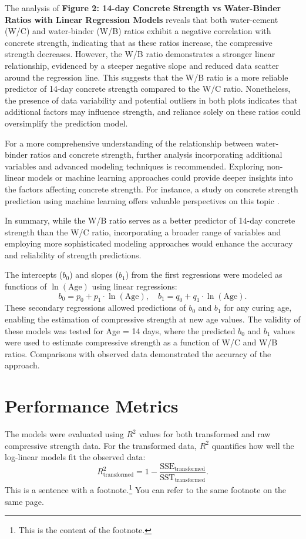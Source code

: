 \documentclass[a4paper,11pt]{article}
\begin{document}
The analysis of \textbf{Figure 2: 14-day Concrete Strength vs Water-Binder Ratios with Linear Regression Models} reveals that both water-cement (W/C) and water-binder (W/B) ratios exhibit a negative correlation with concrete strength, indicating that as these ratios increase, the compressive strength decreases. However, the W/B ratio demonstrates a stronger linear relationship, evidenced by a steeper negative slope and reduced data scatter around the regression line. This suggests that the W/B ratio is a more reliable predictor of 14-day concrete strength compared to the W/C ratio. Nonetheless, the presence of data variability and potential outliers in both plots indicates that additional factors may influence strength, and reliance solely on these ratios could oversimplify the prediction model.

For a more comprehensive understanding of the relationship between water-binder ratios and concrete strength, further analysis incorporating additional variables and advanced modeling techniques is recommended. Exploring non-linear models or machine learning approaches could provide deeper insights into the factors affecting concrete strength. For instance, a study on concrete strength prediction using machine learning offers valuable perspectives on this topic \cite{concrete_ml}.


In summary, while the W/B ratio serves as a better predictor of 14-day concrete strength than the W/C ratio, incorporating a broader range of variables and employing more sophisticated modeling approaches would enhance the accuracy and reliability of strength predictions.


The intercepts (\( b_0 \)) and slopes (\( b_1 \)) from the first regressions were modeled as functions of \( \ln(\text{Age}) \) using linear regressions:
\[
b_0 = p_0 + p_1 \cdot \ln(\text{Age}), \quad b_1 = q_0 + q_1 \cdot \ln(\text{Age}).
\]
These secondary regressions allowed predictions of \( b_0 \) and \( b_1 \) for any curing age, enabling the estimation of compressive strength at new age values. The validity of these models was tested for Age = 14 days, where the predicted \( b_0 \) and \( b_1 \) values were used to estimate compressive strength as a function of W/C and W/B ratios. Comparisons with observed data demonstrated the accuracy of the approach.

\section*{Performance Metrics}
The models were evaluated using \( R^2 \) values for both transformed and raw compressive strength data. For the transformed data, \( R^2 \) quantifies how well the log-linear models fit the observed data:
\[
R^2_{\text{transformed}} = 1 - \frac{\text{SSE}_{\text{transformed}}}{\text{SST}_{\text{transformed}}}.
\]
This is a sentence with a footnote.\footnote{This is the content of the footnote.\label{footnote:example}}
You can refer to the same footnote on the same page.
\end{document}
